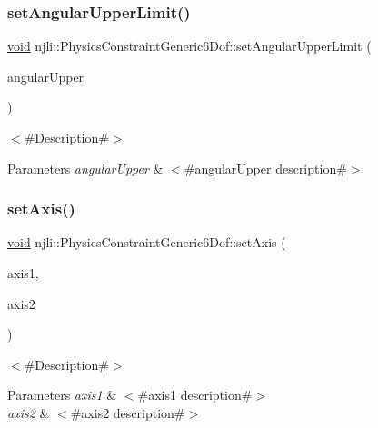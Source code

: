 \subsubsection{\texorpdfstring{set\+Angular\+Upper\+Limit()}{setAngularUpperLimit()}}
{\footnotesize\ttfamily \mbox{\hyperlink{_thread_8h_af1e856da2e658414cb2456cb6f7ebc66}{void}} njli\+::\+Physics\+Constraint\+Generic6\+Dof\+::set\+Angular\+Upper\+Limit (\begin{DoxyParamCaption}\item[{const bt\+Vector3 \&}]{angular\+Upper }\end{DoxyParamCaption})}

$<$\#\+Description\#$>$


\begin{DoxyParams}{Parameters}
{\em angular\+Upper} & $<$\#angular\+Upper description\#$>$ \\
\hline
\end{DoxyParams}
\mbox{\label{classnjli_1_1_physics_constraint_generic6_dof_a476bea05db9265b4efacc503b6693615}} 
\subsubsection{\texorpdfstring{set\+Axis()}{setAxis()}}
{\footnotesize\ttfamily \mbox{\hyperlink{_thread_8h_af1e856da2e658414cb2456cb6f7ebc66}{void}} njli\+::\+Physics\+Constraint\+Generic6\+Dof\+::set\+Axis (\begin{DoxyParamCaption}\item[{const bt\+Vector3 \&}]{axis1,  }\item[{const bt\+Vector3 \&}]{axis2 }\end{DoxyParamCaption})}

$<$\#\+Description\#$>$


\begin{DoxyParams}{Parameters}
{\em axis1} & $<$\#axis1 description\#$>$ \\
\hline
{\em axis2} & $<$\#axis2 description\#$>$ \\
\hline
\end{DoxyParams}
\mbox{\label{classnjli_1_1_physics_constraint_generic6_dof_ad0fd838dfb528aa5d473236951452a93}} 
